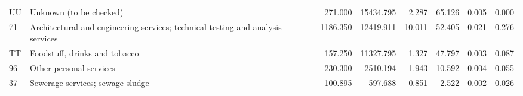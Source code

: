 \begin{tabular}{llrrrrrr}
 UU & Unknown (to be checked) & 271.000 & 15434.795 & 2.287 & 65.126 & 0.005 & 0.000 \\
 71 & Architectural and engineering services; technical testing and analysis services & 1186.350 & 12419.911 & 10.011 & 52.405 & 0.021 & 0.276 \\
 TT & Foodstuff, drinks and tobacco & 157.250 & 11327.795 & 1.327 & 47.797 & 0.003 & 0.087 \\
 96 & Other personal services & 230.300 & 2510.194 & 1.943 & 10.592 & 0.004 & 0.055 \\
 37 & Sewerage services; sewage sludge & 100.895 & 597.688 & 0.851 & 2.522 & 0.002 & 0.026 \\
\bottomrule
\end{tabular}
